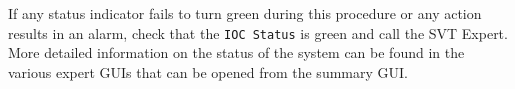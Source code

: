 \documentclass[12pt]{report}
\begin{document}
If any status indicator fails to turn green during this procedure or any action results in an alarm, check that the \texttt{IOC Status} is green and call the SVT Expert.  More detailed information on the status of the system can be found in the various expert GUIs that can be opened from the summary GUI.

%
%
\end{document}
